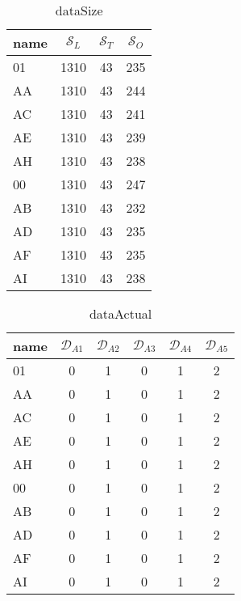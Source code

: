 \documentclass{article}
\begin{document}
\begin{table}[ht]
\centering
\begin{tabular}{|l|c|c|c|}
\hline
name  & $\mathcal{S}_L$ & $\mathcal{S}_T$ & $\mathcal{S}_O$ \\ \hline
01 & 1310 & 43 & 235   \\ \hline
AA & 1310 & 43 & 244   \\ \hline
AC & 1310 & 43 & 241   \\ \hline
AE & 1310 & 43 & 239   \\ \hline
AH & 1310 & 43 & 238   \\ \hline
00 & 1310 & 43 & 247   \\ \hline
AB & 1310 & 43 & 232   \\ \hline
AD & 1310 & 43 & 235   \\ \hline
AF & 1310 & 43 & 235   \\ \hline
AI & 1310 & 43 & 238   \\ \hline
\end{tabular}
\caption{dataSize}
\label{Tab:dataSize}
\end{table}


\begin{table}[ht]
\centering
\begin{tabular}{|l|c|c|c|c|c|}
\hline
name & $\mathcal{D}_{A1}$ & $\mathcal{D}_{A2}$ & $\mathcal{D}_{A3}$ & $\mathcal{D}_{A4}$ & $\mathcal{D}_{A5}$ \\ \hline
01 & 0 & 1 & 0 & 1 & 2 \\ \hline
AA & 0 & 1 & 0 & 1 & 2 \\ \hline
AC & 0 & 1 & 0 & 1 & 2 \\ \hline
AE & 0 & 1 & 0 & 1 & 2 \\ \hline
AH & 0 & 1 & 0 & 1 & 2 \\ \hline
00 & 0 & 1 & 0 & 1 & 2 \\ \hline
AB & 0 & 1 & 0 & 1 & 2 \\ \hline
AD & 0 & 1 & 0 & 1 & 2 \\ \hline
AF & 0 & 1 & 0 & 1 & 2 \\ \hline
AI & 0 & 1 & 0 & 1 & 2 \\ \hline
\end{tabular}
\caption{dataActual}
\label{Tab:dataActual}
\end{table}
\end{document}
